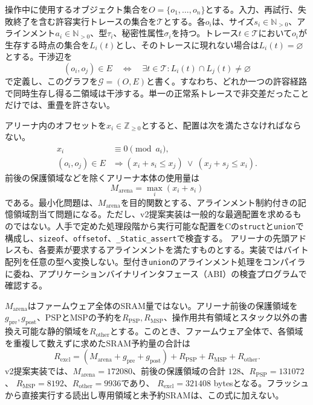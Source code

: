 \documentclass[a4paper,10pt]{ltjsarticle}
\theoremstyle{definition}
\theoremstyle{remark}
\begin{document}
操作中に使用するオブジェクト集合を$O=\{o_1,\ldots,o_n\}$とする。入力、再試行、失敗終了を含む許容実行トレースの集合を$\mathcal{T}$とする。各$o_i$は、サイズ$s_i\in\mathbb{N}_{>0}$、アラインメント$a_i\in\mathbb{N}_{>0}$、型$\tau_i$、秘密性属性$\sigma_i$を持つ。トレース$t\in\mathcal{T}$において$o_i$が生存する時点の集合を$L_i(t)$とし、そのトレースに現れない場合は$L_i(t)=\varnothing$とする。干渉辺を
\begin{equation}
  (o_i,o_j)\in E
  \quad\Longleftrightarrow\quad
  \exists t\in\mathcal{T}:L_i(t)\cap L_j(t)\neq\varnothing
  \label{eq:interference}
\end{equation}
で定義し、このグラフを$\mathcal{G}=(O,E)$と書く。すなわち、どれか一つの許容経路で同時生存し得る二領域は干渉する。単一の正常系トレースで非交差だったことだけでは、重畳を許さない。

アリーナ内のオフセットを$x_i\in\mathbb{Z}_{\geq 0}$とすると、配置は次を満たさなければならない。
\begin{align}
  x_i &\equiv 0 \pmod{a_i}, \\
  (o_i,o_j)\in E
  &\Longrightarrow
  (x_i+s_i\leq x_j)\ \lor\ (x_j+s_j\leq x_i).
  \label{eq:nonoverlap}
\end{align}
前後の保護領域などを除くアリーナ本体の使用量は
\begin{equation}
  M_{\mathrm{arena}}=\max_i(x_i+s_i)
  \label{eq:arena-height}
\end{equation}
である。最小化問題は、$M_{\mathrm{arena}}$を目的関数とする、アラインメント制約付きの記憶領域割当て問題になる。ただし、v2提案実装は一般的な最適配置を求めるものではない。人手で定めた処理段階から実行可能な配置をCの\texttt{struct}と\texttt{union}で構成し、\texttt{sizeof}、\texttt{offsetof}、\texttt{\_Static\_assert}で検査する。
アリーナの先頭アドレスも、各要素が要求するアラインメントを満たすものとする。実装ではバイト配列を任意の型へ変換しない。型付き\texttt{union}のアラインメント処理をコンパイラに委ね、アプリケーションバイナリインタフェース（ABI）の検査プログラムで確認する。

$M_{\mathrm{arena}}$はファームウェア全体のSRAM量ではない。アリーナ前後の保護領域を$g_{\mathrm{pre}},g_{\mathrm{post}}$、PSPとMSPの予約を$R_{\mathrm{PSP}},R_{\mathrm{MSP}}$、操作用共有領域とスタック以外の書換え可能な静的領域を$R_{\mathrm{other}}$とする。このとき、ファームウェア全体で、各領域を重複して数えずに求めたSRAM予約量の合計は
\begin{equation}
  R_{\mathrm{excl}}=
  (M_{\mathrm{arena}}+g_{\mathrm{pre}}+g_{\mathrm{post}})
  +R_{\mathrm{PSP}}+R_{\mathrm{MSP}}+R_{\mathrm{other}}.
  \label{eq:exclusive-sram}
\end{equation}
v2提案実装では、$M_{\mathrm{arena}}=\num{172080}$、前後の保護領域の合計
$128$、$R_{\mathrm{PSP}}=\num{131072}$、
$R_{\mathrm{MSP}}=\num{8192}$、$R_{\mathrm{other}}=\num{9936}$であり、
$R_{\mathrm{excl}}=\num{321408}$ bytesとなる。フラッシュから直接実行する読出し専用領域と未予約SRAMは、この式に加えない。
\end{document}
